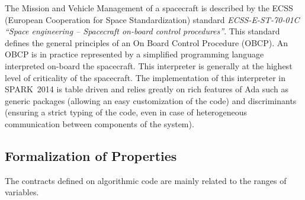 \documentclass[10pt,a4paper,twocolumn]{article}
\newcommand{\newspark}{SPARK~2014\xspace}
\begin{document}
The Mission and Vehicle Management of a spacecraft is described by the ECSS (European Cooperation for Space Standardization) standard
{\it ECSS-E-ST-70-01C ``Space engineering -- Spacecraft on-board control
procedures''}.
This standard defines the general principles of an On Board Control Procedure
(OBCP). An OBCP is in practice represented by a simplified programming language
interpreted on-board the spacecraft. This interpreter is generally at the
highest level of criticality of the spacecraft. The implementation of this
interpreter in \newspark is table driven and relies greatly on rich features of Ada such as generic packages
(allowing an easy customization of the code)
and discriminants
(ensuring a strict typing of the code, even in case of heterogeneous
communication between components of the system).


\subsection{Formalization of Properties}

The contracts defined on algorithmic code are mainly related to the ranges of
variables.

\end{document}
